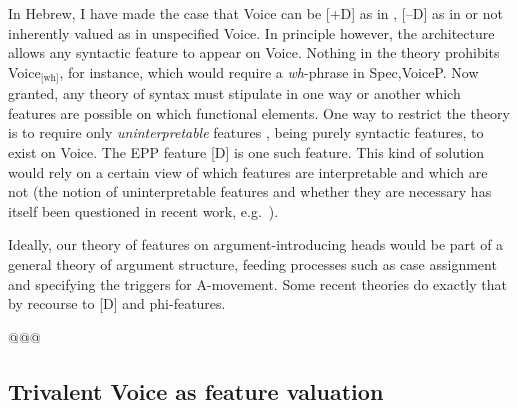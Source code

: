 In Hebrew, I have made the case that Voice can be [+D] as in {\vd}, [--D] as in {\vz} or not inherently valued as in unspecified Voice. In principle however, the architecture allows any syntactic feature to appear on Voice. Nothing in the theory prohibits Voice$_{\text{[wh]}}$, for instance, which would require a \emph{wh}-phrase in Spec,VoiceP. Now granted, any theory of syntax must stipulate in one way or another which features are possible on which functional elements. One way to restrict the theory is to require only \emph{uninterpretable} features \citep{chomsky95}, being purely syntactic features, to exist on Voice. The EPP feature [D] is one such feature. This kind of solution would rely on a certain view of which features are interpretable and which are not (the notion of uninterpretable features and whether they are necessary has itself been questioned in recent work, e.g.~\citealt{preminger14mit}).

Ideally, our theory of features on argument-introducing heads would be part of a general theory of argument structure, feeding processes such as case assignment and specifying the triggers for A-movement. Some recent theories do exactly that by recourse to [D] and phi-features.

@@@
	\subsection{Trivalent Voice as feature valuation} \label{i:agree:nie}





